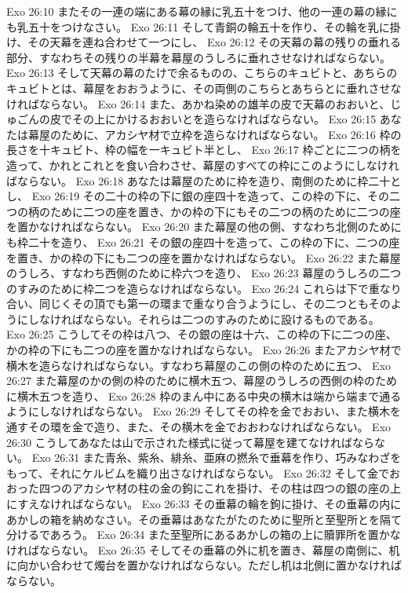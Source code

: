 Exo 26:10  またその一連の端にある幕の縁に乳五十をつけ、他の一連の幕の縁にも乳五十をつけなさい。
Exo 26:11  そして青銅の輪五十を作り、その輪を乳に掛け、その天幕を連ね合わせて一つにし、
Exo 26:12  その天幕の幕の残りの垂れる部分、すなわちその残りの半幕を幕屋のうしろに垂れさせなければならない。
Exo 26:13  そして天幕の幕のたけで余るものの、こちらのキュビトと、あちらのキュビトとは、幕屋をおおうように、その両側のこちらとあちらとに垂れさせなければならない。
Exo 26:14  また、あかね染めの雄羊の皮で天幕のおおいと、じゅごんの皮でその上にかけるおおいとを造らなければならない。
Exo 26:15  あなたは幕屋のために、アカシヤ材で立枠を造らなければならない。
Exo 26:16  枠の長さを十キュビト、枠の幅を一キュビト半とし、
Exo 26:17  枠ごとに二つの柄を造って、かれとこれとを食い合わさせ、幕屋のすべての枠にこのようにしなければならない。
Exo 26:18  あなたは幕屋のために枠を造り、南側のために枠二十とし、
Exo 26:19  その二十の枠の下に銀の座四十を造って、この枠の下に、その二つの柄のために二つの座を置き、かの枠の下にもその二つの柄のために二つの座を置かなければならない。
Exo 26:20  また幕屋の他の側、すなわち北側のためにも枠二十を造り、
Exo 26:21  その銀の座四十を造って、この枠の下に、二つの座を置き、かの枠の下にも二つの座を置かなければならない。
Exo 26:22  また幕屋のうしろ、すなわち西側のために枠六つを造り、
Exo 26:23  幕屋のうしろの二つのすみのために枠二つを造らなければならない。
Exo 26:24  これらは下で重なり合い、同じくその頂でも第一の環まで重なり合うようにし、その二つともそのようにしなければならない。それらは二つのすみのために設けるものである。
Exo 26:25  こうしてその枠は八つ、その銀の座は十六、この枠の下に二つの座、かの枠の下にも二つの座を置かなければならない。
Exo 26:26  またアカシヤ材で横木を造らなければならない。すなわち幕屋のこの側の枠のために五つ、
Exo 26:27  また幕屋のかの側の枠のために横木五つ、幕屋のうしろの西側の枠のために横木五つを造り、
Exo 26:28  枠のまん中にある中央の横木は端から端まで通るようにしなければならない。
Exo 26:29  そしてその枠を金でおおい、また横木を通すその環を金で造り、また、その横木を金でおおわなければならない。
Exo 26:30  こうしてあなたは山で示された様式に従って幕屋を建てなければならない。
Exo 26:31  また青糸、紫糸、緋糸、亜麻の撚糸で垂幕を作り、巧みなわざをもって、それにケルビムを織り出さなければならない。
Exo 26:32  そして金でおおった四つのアカシヤ材の柱の金の鉤にこれを掛け、その柱は四つの銀の座の上にすえなければならない。
Exo 26:33  その垂幕の輪を鉤に掛け、その垂幕の内にあかしの箱を納めなさい。その垂幕はあなたがたのために聖所と至聖所とを隔て分けるであろう。
Exo 26:34  また至聖所にあるあかしの箱の上に贖罪所を置かなければならない。
Exo 26:35  そしてその垂幕の外に机を置き、幕屋の南側に、机に向かい合わせて燭台を置かなければならない。ただし机は北側に置かなければならない。
